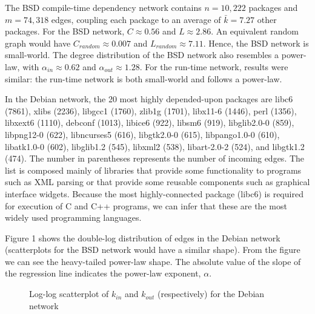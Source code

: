 \documentclass{elsart}
\begin{document}
The BSD compile-time dependency network contains $n=10,222$ packages and $m=74,318$ edges, coupling 
each package to an average of $\bar{k}=7.27$ other packages. For the BSD network, $C\approx0.56$ and $L\approx2.86$. An equivalent random graph 
would have $C_{random}\approx0.007$ and $L_{random}\approx7.11$. Hence, the BSD network is small-world. The degree 
distribution of the BSD network also resembles a power-law, with $\alpha_{in}\approx0.62$ and 
$\alpha_{out}\approx1.28$. For the run-time network, results were similar: the run-time network is both small-world 
and follows a power-law.
\par In the Debian network, the 20 most highly depended-upon packages are libc6 (7861), xlibs (2236), 
libgcc1 (1760), zlib1g (1701), libx11-6 (1446), perl (1356), libxext6 (1110), debconf (1013), libice6 (922), libsm6 (919), 
libglib2.0-0 (859), libpng12-0 (622), libncurses5 (616), libgtk2.0-0 (615), libpango1.0-0 (610), libatk1.0-0 (602), 
libglib1.2 (545), libxml2 (538), libart-2.0-2 (524), and libgtk1.2 (474). The number in parentheses represents the 
number of incoming edges.  The list is composed mainly of libraries that provide some functionality to programs such as XML parsing or that provide some reusable components 
such as graphical interface widgets. Because the most highly-connected package (libc6) is required for execution of C 
and C++ programs, we can infer that these are the  most widely used programming languages.

Figure 1 shows the double-log distribution of edges in the Debian network (scatterplots for the BSD network would 
have a similar shape). From the figure we can see the heavy-tailed power-law shape. The absolute value of the slope 
of the regression line indicates the power-law exponent, $\alpha$.
\begin{figure}
\centering
\epsfysize=1.5in
\caption{Log-log scatterplot of $k_{in}$ and $k_{out}$ (respectively) for the Debian network}
\end{figure}
\end{document}
